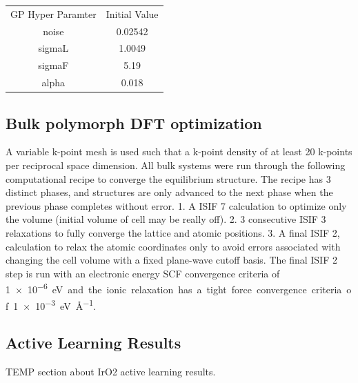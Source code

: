 \begin{table}[htbp]
\centering
\begin{tabular}{cc}
  GP Hyper Paramter & Initial Value \\
  noise & 0.02542 \\
  sigmaL & 1.0049 \\
  sigmaF & 5.19 \\
  alpha & 0.018
\end{tabular}
\end{table}



\subsection{Bulk polymorph DFT optimization}  %
%
%
A variable k-point mesh is used such that a k-point density of at least \num{20} k-points per reciprocal space dimension.
%
All bulk systems were run through the following computational recipe to converge the equilibrium structure.
%
The recipe has \num{3} distinct phases, and structures are only advanced to the next phase when the previous phase completes without error.
%
1. A ISIF \num{7} calculation to optimize only the volume (initial volume of cell may be really off).
%
2. \num{3} consecutive ISIF \num{3} relaxations to fully converge the lattice and atomic positions.
%
3. A final ISIF \num{2}, calculation to relax the atomic coordinates only to avoid errors associated with changing the cell volume with a fixed plane-wave cutoff basis.
%
The final ISIF \num{2} step is run with an electronic energy SCF convergence criteria of \SI{1e-6} eV and the ionic relaxation has a tight force convergence criteria of \SI{1e-3}{\electronvolt\per\angstrom}.


\subsection{\IrOtwo Active Learning Results} %
%
TEMP section about IrO2 active learning results.

